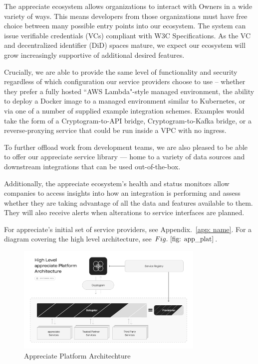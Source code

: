 \documentclass[a4paper,onecolumn, 10.5pt]{article}
\begin{document}
The appreciate ecosystem allows organizations to interact with Owners in a wide variety of ways. This means developers from those organizations must have free choice between many possible entry points into our ecosystem. The system can issue verifiable credentials (VCs) compliant with W3C Specifications\cite{verifiablecred}. As the VC and decentralized identifier (DiD) spaces mature, we expect our ecosystem will grow increasingly supportive of additional desired features.

Crucially, we are able to provide the same level of functionality and security regardless of which configuration our service providers choose to use -- whether they prefer a fully hosted “AWS Lambda"-style managed environment, the ability to deploy a Docker image\cite{modernapparch} to a managed environment similar to Kubernetes, 
or via one of a number of supplied example integration schemes. Examples would take the form of a Cryptogram-to-API bridge, Cryptogram-to-Kafka bridge, or a reverse-proxying service that could be run inside a VPC with no ingress.

To further offload work from development teams, we are also pleased to be able to offer our appreciate service library — home to a variety of data sources and downstream integrations that can be used out-of-the-box.

Additionally, the appreciate ecosystem’s health and status monitors allow companies to access insights into how an integration is performing and assess whether they are taking advantage of all the data and features available to them. They will also receive alerts when alterations to service interfaces are planned.


For appreciate’s initial set of service providers, see Appendix.~\ref{app: name}. 
For a diagram covering the high level architecture,  see \(Fig.~\ref{fig: app_plat} \). 

\begin{figure}[!htb]
	\centering %
		\includegraphics[clip, trim=0cm 2cm 0cm 2cm, width=0.80\textwidth]{./images/Architecture.pdf}
	\caption{Appreciate Platform Architechture}
	\label{fig: app_plat}
\end{figure}
\end{document}
